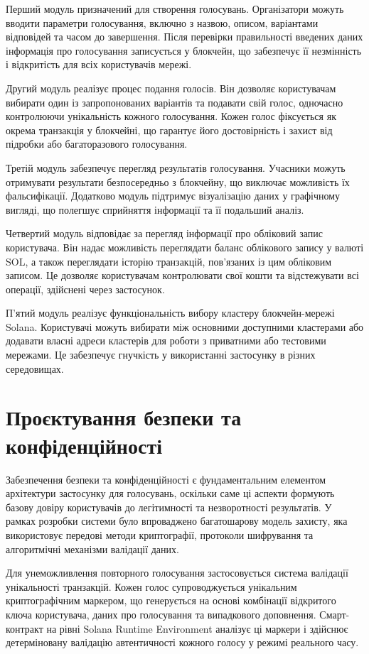 \documentclass[14pt]{extreport}
\begin{document}
  Перший модуль призначений для створення голосувань. Організатори можуть вводити параметри голосування, включно з назвою, описом, варіантами відповідей та часом до завершення. Після перевірки правильності введених даних інформація про голосування записується у блокчейн, що забезпечує її незмінність і відкритість для всіх користувачів мережі.

  Другий модуль реалізує процес подання голосів. Він дозволяє користувачам вибирати один із запропонованих варіантів та подавати свій голос, одночасно контролюючи унікальність кожного голосування. Кожен голос фіксується як окрема транзакція у блокчейні, що гарантує його достовірність і захист від підробки або багаторазового голосування.

  Третій модуль забезпечує перегляд результатів голосування. Учасники можуть отримувати результати безпосередньо з блокчейну, що виключає можливість їх фальсифікації. Додатково модуль підтримує візуалізацію даних у графічному вигляді, що полегшує сприйняття інформації та її подальший аналіз.

  Четвертий модуль відповідає за перегляд інформації про обліковий запис користувача. Він надає можливість переглядати баланс облікового запису у валюті SOL, а також переглядати історію транзакцій, пов'язаних із цим обліковим записом. Це дозволяє користувачам контролювати свої кошти та відстежувати всі операції, здійснені через застосунок.

  П'ятий модуль реалізує функціональність вибору кластеру блокчейн-мережі Solana. Користувачі можуть вибирати між основними доступними кластерами або додавати власні адреси кластерів для роботи з приватними або тестовими мережами. Це забезпечує гнучкість у використанні застосунку в різних середовищах.
  
  \section{Проєктування безпеки та конфіденційності}
  
  Забезпечення безпеки та конфіденційності є фундаментальним елементом архітектури застосунку для голосувань, оскільки саме ці аспекти формують базову довіру користувачів до легітимності та незворотності результатів. У рамках розробки системи було впроваджено багатошарову модель захисту, яка використовує передові методи криптографії, протоколи шифрування та алгоритмічні механізми валідації даних.

  Для унеможливлення повторного голосування застосовується система валідації унікальності транзакцій. Кожен голос супроводжується унікальним криптографічним маркером, що генерується на основі комбінації відкритого ключа користувача, даних про голосування та випадкового доповнення. Смарт-контракт на рівні Solana Runtime Environment аналізує ці маркери і здійснює детерміновану валідацію автентичності кожного голосу у режимі реального часу.
\end{document}
